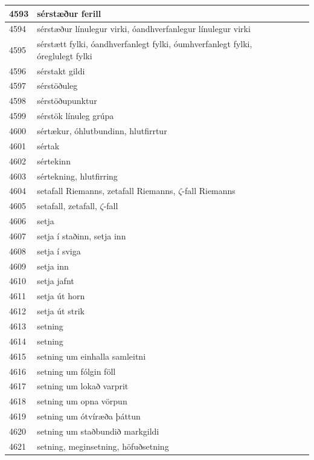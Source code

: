 \begin{longtable}{p{}|p{}|p{}|p{}|p{}}
\hline
4593 & sérstæður ferill &  &  &  \\
\hline
4594 & sérstæður línulegur virki, óandhverfanlegur línulegur virki &  &  &  \\
\hline
4595 & sérstætt fylki, óandhverfanlegt fylki, óumhverfanlegt fylki, óreglulegt fylki &  &  &  \\
\hline
4596 & sérstakt gildi &  &  &  \\
\hline
4597 & sérstöðuleg &  &  &  \\
\hline
4598 & sérstöðupunktur &  &  &  \\
\hline
4599 & sérstök línuleg grúpa &  &  &  \\
\hline
4600 & sértækur, óhlutbundinn, hlutfirrtur &  &  &  \\
\hline
4601 & sértak &  &  &  \\
\hline
4602 & sértekinn &  &  &  \\
\hline
4603 & sértekning, hlutfirring &  &  &  \\
\hline
4604 & setafall Riemanns, zetafall Riemanns, \(\zeta\)-fall Riemanns &  &  &  \\
\hline
4605 & setafall, zetafall, \(\zeta\)-fall &  &  &  \\
\hline
4606 & setja &  &  &  \\
\hline
4607 & setja í staðinn, setja inn &  &  &  \\
\hline
4608 & setja í sviga &  &  &  \\
\hline
4609 & setja inn &  &  &  \\
\hline
4610 & setja jafnt &  &  &  \\
\hline
4611 & setja út horn &  &  &  \\
\hline
4612 & setja út strik &  &  &  \\
\hline
4613 & setning &  &  &  \\
\hline
4614 & setning &  &  &  \\
\hline
4615 & setning um einhalla samleitni &  &  &  \\
\hline
4616 & setning um fólgin föll &  &  &  \\
\hline
4617 & setning um lokað varprit &  &  &  \\
\hline
4618 & setning um opna vörpun &  &  &  \\
\hline
4619 & setning um ótvíræða þáttun &  &  &  \\
\hline
4620 & setning um staðbundið markgildi &  &  &  \\
\hline
4621 & setning, meginsetning, höfuðsetning &  &  &  \\

\end{longtable}
